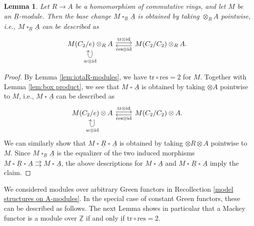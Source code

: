 \documentclass[10pt]{amsart}
\newtheorem{lem}[thm]{Lemma}
\theoremstyle{definition}
\numberwithin{equation}{section}
\newcommand{\Z}{\mathbb{Z}}
\newcommand{\ul}{\underline}
\newcommand{\id}{\mathrm{id}}
\DeclareMathOperator{\sotimes}{\square}
\newcommand{\tr}{\mathrm{tr}}
\newcommand{\res}{\mathrm{res}}
\begin{document}
\begin{lem}
\label{lem:box base change}
Let $R\to A$ be a homomorphism of commutative rings,
and let $M$ be an $\ul{R}$-module.
Then the base change $M\sotimes_{\ul{R}}\ul{A}$ is obtained by taking $\otimes_{R} A$ pointwise,
i.e., $M\sotimes_{\ul{R}}\ul{A}$ can be described as
\[
\begin{tikzcd}
M(C_2/e)\otimes_R A\ar[loop below,"w\otimes \id"]\ar[r,shift left=0.5ex,"\tr \otimes \id"]\ar[r,shift right=0.5ex,leftarrow,"\res \otimes \id"']&
M(C_2/C_2)\otimes_R A.
\end{tikzcd}
\]
\end{lem}
\begin{proof}
By Lemma \ref{lem:iotaR-modules},
we have $\tr\circ \res=2$ for $M$.
Together with Lemma \ref{lem:box product},
we see that $M\sotimes \ul{A}$ is obtained by taking $\otimes A$ pointwise to $M$,
i.e., $M\sotimes \ul{A}$ can be described as
\[
\begin{tikzcd}
M(C_2/e)\otimes  A\ar[loop below,"w\otimes \id"]\ar[r,shift left=0.5ex,"\tr \otimes \id"]\ar[r,shift right=0.5ex,leftarrow,"\res \otimes \id"']&
M(C_2/C_2)\otimes  A.
\end{tikzcd}
\]
We can similarly show that $M\sotimes \ul{R}\sotimes \ul{A}$ is obtained by taking $\otimes R \otimes A$ pointwise to $M$.
Since $M\sotimes_{\ul{R}} \ul{A}$ is the equalizer of the two induced morphisms $M\sotimes \ul{R}\sotimes \ul{A} \rightrightarrows M\sotimes \ul{A}$,
the above descriptions for $M\sotimes \ul{A}$ and $M\sotimes \ul{R} \sotimes \ul{A}$ imply the claim.
\end{proof}

We considered modules over arbitrary Green functors in Recollection \ref{model structures on A-modules}. In the special case of constant Green functors, these can be described as follows.
The next Lemma shows in particular that a Mackey functor is a module over $\ul{\Z}$ if and only if $\tr \circ \res = 2$.
\end{document}
